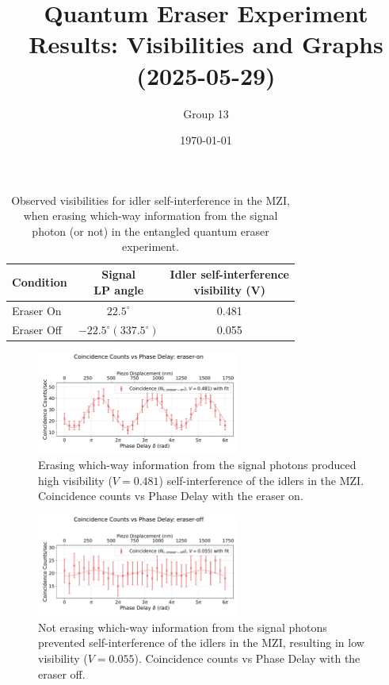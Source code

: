 \documentclass{article}
\title{Quantum Eraser Experiment Results: Visibilities and Graphs (2025-05-29)}
\author{Group 13} %
\date{\today}
\begin{document}
\pagestyle{empty} %

%

\begin{table}[h!]
\centering
\begin{tabular}{lcc}
\toprule
Condition & \makecell{Signal \\ LP angle} & \makecell{Idler self-interference \\ visibility (V)} \\
\midrule
Eraser On          & $22.5^\circ$  & 0.481 \\
Eraser Off         & $-22.5^\circ (337.5^\circ)$ & 0.055 \\
\bottomrule
\end{tabular}
\caption{
  Observed visibilities for idler self-interference in the MZI,
  when erasing which-way information from the signal photon (or not)
  in the entangled quantum eraser experiment.}
\end{table}


\begin{figure}[h!]
\centering
\includegraphics[width=0.6\textwidth]{coincidence_counts_eraser_on.pdf}
\caption{
  Erasing which-way information from the signal photons
  produced high visibility ($V=0.481$) self-interference of the idlers in the MZI.
  Coincidence counts vs Phase Delay with the eraser on.
}
\end{figure}


\begin{figure}[h!]
\centering
\includegraphics[width=0.6\textwidth]{coincidence_counts_eraser_off.pdf}
\caption{
  Not erasing which-way information from the signal photons
  prevented self-interference of the idlers in the MZI,
  resulting in low visibility ($V=0.055$).
  Coincidence counts vs Phase Delay with the eraser off.
}
\end{figure}
\end{document}
